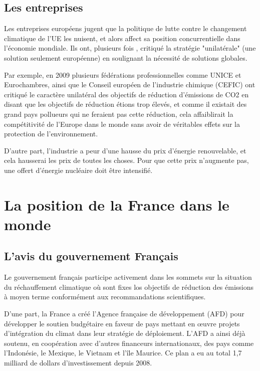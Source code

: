 \documentclass[a4paper,11pt]{article}
\begin{document}
\subsection{Les entreprises}

Les entreprises européens jugent que la politique  de  lutte  contre  le
changement climatique de l'UE les nuisent, et alors affect sa position concurrentielle dans l'économie
mondiale. Ils  ont, plusieurs  fois , critiqué  la stratégie  "unilatérale" (une
solution seulement européenne) en
soulignant la nécessité de solutions globales.

Par  exemple, en  2009  plusieurs fédérations  professionnelles  comme UNICE  et
Eurochambres, ainsi que le Conseil  européen de l'industrie chimique (CEFIC) ont
critiqué le caractère  unilatéral des objectifs de réduction  d'émissions de CO2
en  disant que  les  objectifs de  réduction  étions trop  élevés,  et comme  il
existait des grand  pays pollueurs qui ne feraient pas  cette réduction, cela
affaiblirait la compétitivité de l'Europe dans le monde sans avoir de véritables effets sur la
protection de l'environnement.

D'autre part, l'industrie a peur d'une hausse du prix d'énergie renouvelable, et
cela hausserai  les prix de  toutes les choses.  Pour que cette  prix n'augmente
pas, une offert d'énergie nucléaire doit être intensifié.


\section{La position de la France dans le monde}

\subsection{L’avis du gouvernement  Français}

Le gouvernement français participe activement dans les sommets sur la situation du réchauffement climatique où sont fixes los objectifs de réduction des émissions à moyen terme conformément aux recommandations scientifiques. 

D'une part, la France a créé l’Agence française de développement (AFD) pour développer le soutien budgétaire en faveur de pays mettant en œuvre projets d’intégration du climat dans leur stratégie de déploiement. L’AFD a ainsi déjà soutenu, en coopération avec d’autres financeurs internationaux, des pays comme l’Indonésie, le Mexique, le Vietnam et l’île Maurice. Ce plan a eu au total 1,7 milliard de dollars d’investissement depuis 2008.
\end{document}
